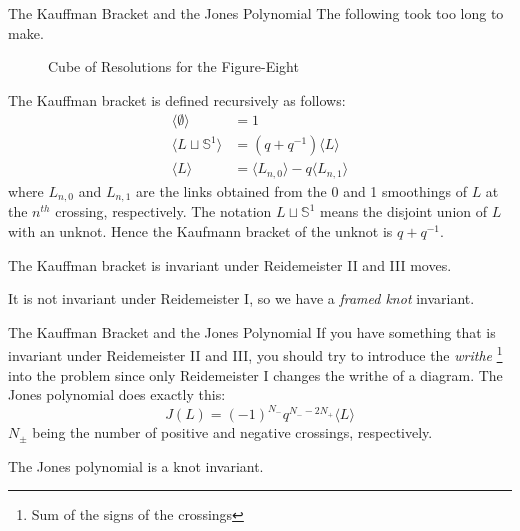 \documentclass{beamer}
\begin{document}
    \begin{frame}{The Kauffman Bracket and the Jones Polynomial}
        The following took too long to make.
        \begin{figure}
            \centering
            \caption{Cube of Resolutions for the Figure-Eight}
            \label{fig:figure_eight_knot_cube_of_resolutions}
        \end{figure}
    \end{frame}
    \begin{frame}
        The Kauffman bracket is defined recursively as follows:
        \begin{align}
            \langle\emptyset\rangle&=1\\
            \langle{L\sqcup\mathbb{S}^{1}}\rangle&=(q+q^{-1})\langle{L}\rangle\\
            \langle{L}\rangle&=
                \langle{L_{n,0}}\rangle-q\langle{L_{n,1}}\rangle
        \end{align}
        where $L_{n,0}$ and $L_{n,1}$ are the links obtained from the
        0 and 1 smoothings of $L$ at the $n^{th}$ crossing, respectively. The
        notation $L\sqcup\mathbb{S}^{1}$ means the disjoint union of
        $L$ with an unknot. Hence the Kaufmann bracket of the
        unknot is $q+q^{-1}$.
        \begin{theorem}
            The Kauffman bracket is invariant under Reidemeister II and III
            moves.
        \end{theorem}
        It is not invariant under Reidemeister I, so we have a
        \textit{framed knot} invariant.
    \end{frame}
    \begin{frame}{The Kauffman Bracket and the Jones Polynomial}
        If you have something that is invariant under Reidemeister II and III,
        you should try to introduce the \textit{writhe}%
        \footnote{Sum of the signs of the crossings}
        into the problem since only Reidemeister I changes the writhe of a
        diagram. The Jones polynomial does exactly this:
        \begin{equation}
            J(L)=(-1)^{N_{-}}q^{N_{-}-2N_{+}}\langle{L}\rangle
        \end{equation}
        $N_{\pm}$ being the number of positive and negative crossings,
        respectively.
        \begin{theorem}
            The Jones polynomial is a knot invariant.
        \end{theorem}
    \end{frame}
\end{document}
